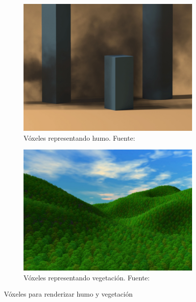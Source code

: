 \begin{figure}
    \begin{center}
        \begin{subfigure}{.49\textwidth}
            \centering
            \includegraphics[width=\textwidth]{voxel-smoke.png}
            \caption{Vóxeles representando humo. Fuente: \cite{voxel-smoke}}
        \end{subfigure}
        \begin{subfigure}{.49\textwidth}
            \centering
            \includegraphics[width=\textwidth]{voxels-for-trees.png}
            \caption{Vóxeles representando vegetación. Fuente: \cite{voxels-for-trees}}
        \end{subfigure}
    \end{center}
    \caption{Vóxeles para renderizar humo y vegetación}
    \label{fig:voxels_for_rendering}
\end{figure}

